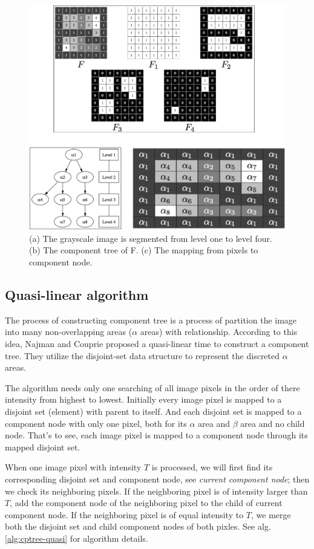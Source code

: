 \begin{figure}[htbp]
\centering
\includegraphics[width=1.0\textwidth]{images/cptree_alpha}
\caption[Component tree construction illustration]{(a) The grayscale image is segmented from level one to level four. (b) The component tree of F. (c) The mapping from pixels to component node.}
\label{fig:cptree-alpha}
\end{figure}

\subsection{Quasi-linear algorithm}
The process of constructing component tree is a process of partition the image into many non-overlapping areas ($\alpha$ areas) with relationship. According to this idea, Najman and Couprie\cite{najman2006building} proposed a quasi-linear time to construct a component tree. They utilize the disjoint-set data structure  to represent the discreted $\alpha$ areas.

The algorithm needs only one searching of all image pixels in the order of there intensity from highest to lowest. Initially every image pixel is mapped to a disjoint set (element) with parent to itself. And each disjoint set is mapped to a component node with only one pixel, both for its $\alpha$ area and $\beta$ area and no child node. That's to see, each image pixel is mapped to a component node through its mapped disjoint set.

When one image pixel with intensity $T$ is processed, we will first find its corresponding disjoint set and component node, see \emph{current component node}; then we check its neighboring pixels. If the neighboring pixel is of intensity larger than $T$, add the component node of the neighboring pixel to the child of current component node. If the neighboring pixel is of equal intensity to $T$, we merge both the disjoint set and child component nodes of both pixles. See alg.\ref{alg:cptree-quasi} for algorithm details.


